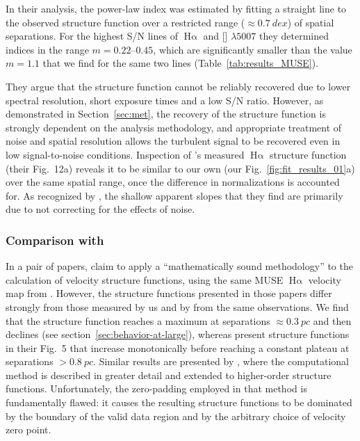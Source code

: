 \documentclass[fleqn,usenatbib, useAMS, a4paper]{mnras}
\newcommand\ha{\ensuremath{\text{H}\upalpha}}
\newcommand\Wav[1]{\ensuremath{\lambda #1}}
\newcommand\halpha{\ha}
\newcommand\oiii{[\ion{O}{III}] \Wav{5007}}
\begin{document}
In their analysis, the power-law index was estimated by fitting a straight line to the observed structure function over a restricted range (\(\approx \qty{0.7}{dex}\))
of spatial separations.
For the highest S/N lines of \halpha{} and \oiii{} they determined indices in the range
\(m = \numrange{0.22}{0.45}\),
which are significantly smaller than the value \(m = 1.1\) that we find for the same two lines (Table~\ref{tab:results_MUSE}).

They argue that the structure function cannot be reliably recovered due to lower spectral resolution, short exposure times and a low S/N ratio. 
However, as demonstrated in Section~\ref{sec:met}, the recovery of the structure function is strongly dependent on the analysis methodology, and appropriate treatment of noise and spatial resolution allows the turbulent signal to be recovered even in low signal-to-noise conditions.
Inspection of \citeauthor{2016MNRAS.455.4057M}'s measured \halpha{} structure function (their Fig.~12a)
reveals it to be similar to our own (our Fig.~\ref{fig:fit_results_01}a)
over the same spatial range, once the difference in normalizations is accounted for.
As recognized by \citet{2016MNRAS.455.4057M}, the shallow apparent slopes that they find are 
primarily due to not correcting for the effects of noise.



\subsubsection{Comparison with \citet{2019MNRAS.483..704A, Anorve-Zeferino:2023a}}
\label{sec:comp_Anorve}

In a pair of papers, \citet{2019MNRAS.483..704A, Anorve-Zeferino:2023a}
claim to apply a ``mathematically sound methodology'' to the calculation of velocity
structure functions, using the same MUSE \halpha{} velocity map from
\citet{2015A&A...582A.114W}.
However, the structure functions presented in those papers differ strongly
from those measured by us and by \citet{2016MNRAS.455.4057M} from the same observations.
We find that the structure function reaches a maximum at separations
\(\approx \qty{0.3}{pc}\) and then declines
(see section~\ref{sec:behavior-at-large}),
whereas \citet{2019MNRAS.483..704A} present structure functions in their Fig.~5
that increase monotonically before reaching a constant plateau at separations
\(> \qty{0.8}{pc}\).
Similar results are presented by \citet{Anorve-Zeferino:2023a},
where the computational method is described in greater detail
and extended to higher-order structure functions.
Unfortunately, the zero-padding employed in that method is fundamentally flawed:
it causes the resulting structure functions to be dominated by the boundary
of the valid data region and by the arbitrary choice of velocity zero point.
\end{document}
